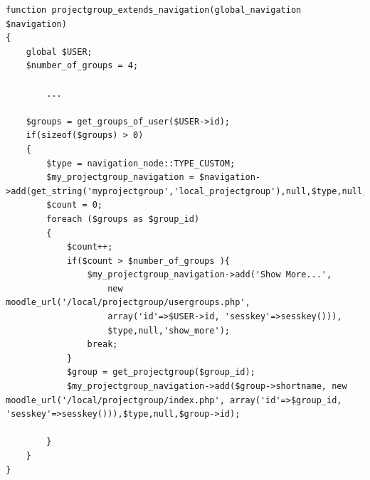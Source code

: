 \begin{lstlisting}[style=phpCode, caption=\myCaption{The code for extending the navigation}, label=src:moodlecodeextendingnavigation]
function projectgroup_extends_navigation(global_navigation $navigation) 
{
	global $USER;
	$number_of_groups = 4;
	
		...
	
	$groups = get_groups_of_user($USER->id);
	if(sizeof($groups) > 0)
	{
		$type = navigation_node::TYPE_CUSTOM;
		$my_projectgroup_navigation = $navigation->add(get_string('myprojectgroup','local_projectgroup'),null,$type,null,'myprojectgroup');
		$count = 0;
		foreach ($groups as $group_id) 
		{
			$count++;
			if($count > $number_of_groups ){
				$my_projectgroup_navigation->add('Show More...', 
					new moodle_url('/local/projectgroup/usergroups.php',
					array('id'=>$USER->id, 'sesskey'=>sesskey())),
					$type,null,'show_more');
				break;
			}
			$group = get_projectgroup($group_id);
			$my_projectgroup_navigation->add($group->shortname, new moodle_url('/local/projectgroup/index.php', array('id'=>$group_id, 'sesskey'=>sesskey())),$type,null,$group->id);
			
		}
	}
}
\end{lstlisting}




















